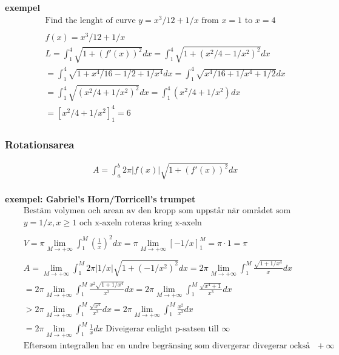 \textbf{exempel}
\begin{align*}
  &\quad  \text{Find the lenght of curve } y=x^3/12+1/x \text{ from } x=1 \text{ to } x=4  \\
  &\quad  \\
  &\quad  f(x)=x^3/12+1/x  \\
  &\quad  L = \int_1^4\sqrt{1+{(f'(x))}^2}dx = \int_1^4\sqrt{1+{(x^2/4-1/x^2)}^2}dx \\
  &\quad  = \int_1^4\sqrt{1+x^4/16-1/2+1/x^4}dx = \int_1^4\sqrt{x^4/16+1/x^4+1/2}dx \\
  &\quad  = \int_1^4\sqrt{{(x^2/4+1/x^2)}^2}dx = \int_1^4(x^2/4+1/x^2)dx \\
  &\quad  = {[x^2/4+1/x^2]}_1^4 = 6
\end{align*}

\newpage

\subsubsection{Rotationsarea}
\begin{align*}
  &\quad  A = \int_a^b 2\pi|f(x)|\sqrt{1+{(f'(x))}^2} dx \\
\end{align*}

\textbf{exempel: Gabriel's Horn/Torricell's trumpet }
\begin{align*}
  &\quad  \text{Bestäm volymen och arean av den kropp som uppstår när området som begränsas av kurvan } \\
  &\quad  y = 1/x, x\geq1 \text{ och x-axeln roteras kring x-axeln} \\
  &\quad  \\
  &\quad  V=\pi \lim_{M\to+\infty} \int_1^M {(\frac{1}{x})}^2 dx = \pi \lim_{M\to+\infty}{[-1/x]}_1^M
  = \pi\cdot1 = \pi \\
  &\quad  \\
  &\quad  A = \lim_{M\to+\infty}\int_1^M 2\pi|1/x|\sqrt{1+{(-1/x^2)}^2} dx
  = 2\pi \lim_{M\to+\infty}\int_1^M \frac{\sqrt{1+1/x^4}}{x} dx \\
  &\quad = 2\pi \lim_{M\to+\infty}\int_1^M \frac{x^2\sqrt{1+1/x^4}}{x^3} dx 
  = 2\pi \lim_{M\to+\infty}\int_1^M \frac{\sqrt{x^4+1}}{x^3} dx \\
  &\quad > 2\pi \lim_{M\to+\infty}\int_1^M \frac{\sqrt{x^4}}{x^3} dx
  = 2\pi \lim_{M\to+\infty}\int_1^M \frac{x^2}{x^3} dx \\
  &\quad = 2\pi \lim_{M\to+\infty}\int_1^M \frac{1}{x} dx  \text{ Diveigerar enlight p-satsen till } \infty \\
  &\quad \text{Eftersom integrallen har en undre begränsing som divergerar divegerar också integrallen till}
  +\infty \\
\end{align*}



